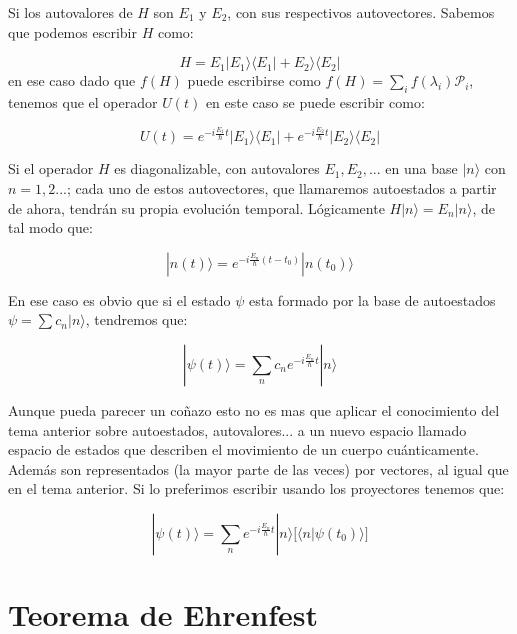 \documentclass[12pt,a4paper]{book}
\numberwithin{equation}{chapter}
\numberwithin{figure}{chapter}
\begin{document}
Si los autovalores de $H$ son $E_1$ y $E_2$, con sus respectivos autovectores. Sabemos que podemos escribir $H$ como:

\begin{equation}
H = E_1 | E_1 \rangle \langle E_1 | +  E_2  \rangle \langle E_2 |
\end{equation}
en ese caso dado que $f(H)$ puede escribirse como $f(H)= \sum_i f(\lambda_i) \mathcal{P}_i$, tenemos que el operador $U(t)$ en este caso se puede escribir como:

\begin{equation}
U(t)=e^{- i \frac{E_1}{\hbar} t}  | E_1 \rangle \langle E_1 | + e^{- i \frac{E_2}{\hbar} t} | E_2 \rangle \langle E_2 |
\end{equation}

\hrulefill

Si el operador $H$ es diagonalizable, con autovalores $E_1,E_2,...$ en una base $|n \rangle$ con $n=1,2...$; cada uno de estos autovectores, que llamaremos autoestados a partir de ahora, tendrán su propia evolución temporal. Lógicamente $H |n\rangle = E_n | n \rangle $, de tal modo que:

\begin{equation}
| n  (t) \rangle =e^{- i \frac{E_n}{\hbar} (t-t_0 )} |n (t_0) \rangle
\end{equation}

En ese caso es obvio que si el estado $\psi$ esta formado por la base de autoestados $\psi = \sum c_n |n\rangle$, tendremos que:

\begin{equation}
| \psi (t) \rangle = \sum_n c_n e^{-i \frac{E_n}{\hbar} t } | n \rangle
\end{equation}

Aunque pueda parecer un coñazo esto no es mas que aplicar el conocimiento del tema anterior sobre autoestados, autovalores... a un nuevo espacio llamado espacio de estados que describen el movimiento de un cuerpo cuánticamente. Además son representados (la mayor parte de las veces) por  vectores, al igual que en el tema anterior. Si lo preferimos escribir usando los proyectores tenemos que:

\begin{equation}
| \psi (t) \rangle =  \sum_n  e^{-i \frac{E_n}{\hbar} t } | n \rangle \Big[ \langle n | \psi (t_0) \rangle \Big]
\end{equation}


\section{Teorema de Ehrenfest}
\end{document}
